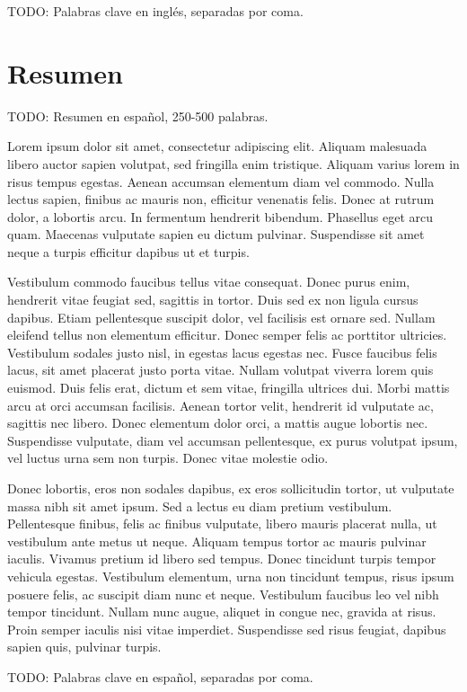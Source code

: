 \begin{keywordsEn}
TODO: Palabras clave en inglés, separadas por coma.
\end{keywordsEn}

\chapter*{Resumen}

\begin{abstractEs}
TODO: Resumen en español, 250-500 palabras.

Lorem ipsum dolor sit amet, consectetur adipiscing elit. Aliquam malesuada libero auctor sapien volutpat, sed fringilla enim tristique. Aliquam varius lorem in risus tempus egestas. Aenean accumsan elementum diam vel commodo. Nulla lectus sapien, finibus ac mauris non, efficitur venenatis felis. Donec at rutrum dolor, a lobortis arcu. In fermentum hendrerit bibendum. Phasellus eget arcu quam. Maecenas vulputate sapien eu dictum pulvinar. Suspendisse sit amet neque a turpis efficitur dapibus ut et turpis.

Vestibulum commodo faucibus tellus vitae consequat. Donec purus enim, hendrerit vitae feugiat sed, sagittis in tortor. Duis sed ex non ligula cursus dapibus. Etiam pellentesque suscipit dolor, vel facilisis est ornare sed. Nullam eleifend tellus non elementum efficitur. Donec semper felis ac porttitor ultricies. Vestibulum sodales justo nisl, in egestas lacus egestas nec. Fusce faucibus felis lacus, sit amet placerat justo porta vitae. Nullam volutpat viverra lorem quis euismod. Duis felis erat, dictum et sem vitae, fringilla ultrices dui. Morbi mattis arcu at orci accumsan facilisis. Aenean tortor velit, hendrerit id vulputate ac, sagittis nec libero. Donec elementum dolor orci, a mattis augue lobortis nec. Suspendisse vulputate, diam vel accumsan pellentesque, ex purus volutpat ipsum, vel luctus urna sem non turpis. Donec vitae molestie odio.

Donec lobortis, eros non sodales dapibus, ex eros sollicitudin tortor, ut vulputate massa nibh sit amet ipsum. Sed a lectus eu diam pretium vestibulum. Pellentesque finibus, felis ac finibus vulputate, libero mauris placerat nulla, ut vestibulum ante metus ut neque. Aliquam tempus tortor ac mauris pulvinar iaculis. Vivamus pretium id libero sed tempus. Donec tincidunt turpis tempor vehicula egestas. Vestibulum elementum, urna non tincidunt tempus, risus ipsum posuere felis, ac suscipit diam nunc et neque. Vestibulum faucibus leo vel nibh tempor tincidunt. Nullam nunc augue, aliquet in congue nec, gravida at risus. Proin semper iaculis nisi vitae imperdiet. Suspendisse sed risus feugiat, dapibus sapien quis, pulvinar turpis.

\end{abstractEs}

\begin{keywordsEs}
TODO: Palabras clave en español, separadas por coma.
\end{keywordsEs}
